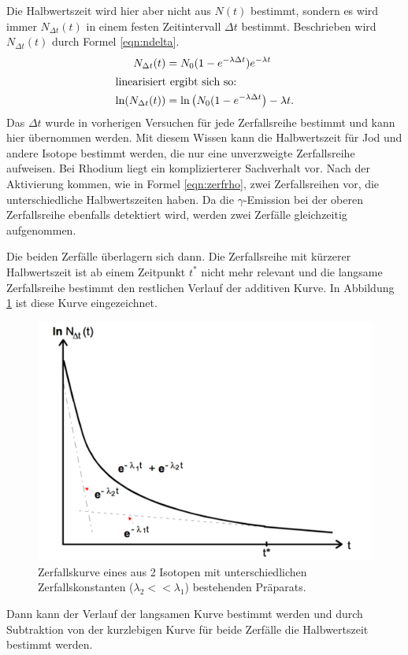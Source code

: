 Die Halbwertszeit wird hier aber nicht aus $N(t)$ bestimmt, sondern es wird immer
$N_{\Delta t}(t)$ in einem festen Zeitintervall $\Delta t$ bestimmt.
Beschrieben wird $N_{\Delta t}(t)$ durch Formel \eqref{eqn:ndelta}.
\begin{align}
  N_{\Delta t}(t) &= N_0(1 - e^{-\lambda\Delta t}) e^{-\lambda t} \label{eqn:ndelta}\\
  \intertext{linearisiert ergibt sich so:}
  \ln(N_{\Delta t}(t)) &= \ln\left( N_0(1-e^{-\lambda\Delta t}\right) - \lambda t \label{eqn:ndeltalinear}.
\end{align}
Das $\Delta t$ wurde in vorherigen Versuchen für jede Zerfallsreihe bestimmt und kann hier übernommen
werden. Mit diesem Wissen kann die Halbwertszeit für Jod und andere Isotope bestimmt werden,
die nur eine unverzweigte Zerfallsreihe aufweisen.
Bei Rhodium liegt ein komplizierterer Sachverhalt vor. Nach der Aktivierung kommen,
wie in Formel \eqref{eqn:zerfrho}, zwei Zerfallsreihen vor, die unterschiedliche Halbwertszeiten
haben. Da die $\gamma$-Emission bei der oberen Zerfallsreihe ebenfalls detektiert wird,
werden zwei Zerfälle gleichzeitig aufgenommen.

Die beiden Zerfälle überlagern sich dann. Die Zerfallsreihe mit kürzerer Halbwertszeit
ist ab einem Zeitpunkt $t^*$ nicht mehr relevant und die langsame Zerfallsreihe bestimmt den restlichen Verlauf
der additiven Kurve. In Abbildung \ref{fig:additivekurve} ist diese Kurve eingezeichnet.%
\begin{figure}[h]
  \centering
  \includegraphics[width = \textwidth]{Pics/additivekurve.pdf}
  \caption{Zerfallskurve eines aus 2 Isotopen mit unterschiedlichen Zerfallskonstanten
   ($\lambda_2 << \lambda_1$) bestehenden Präparats.\cite{anleitung}}
  \label{fig:additivekurve}
\end{figure}
Dann kann der Verlauf der langsamen Kurve bestimmt werden und durch Subtraktion
von der kurzlebigen Kurve für beide Zerfälle die Halbwertszeit bestimmt werden.
